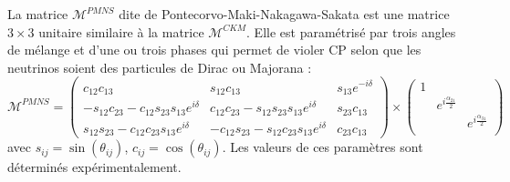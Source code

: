 La matrice $\mathcal{M}^{PMNS}$ dite de Pontecorvo-Maki-Nakagawa-Sakata est une matrice $3\times3$ unitaire similaire à la matrice $\mathcal{M}^{CKM}$. Elle est paramétrisé par trois angles de mélange et d'une ou trois phases qui permet de violer CP selon que les neutrinos soient des particules de Dirac ou Majorana :
\begin{equation}
\mathcal{M}^{PMNS}= 
\begin{pmatrix} 
c_{12}c_{13} & s_{12}c_{13} & s_{13}e^{-i\delta} \\
-s_{12}c_{23}-c_{12}s_{23}s_{13}e^{i\delta} & c_{12}c_{23}-s_{12}s_{23}s_{13}e^{i\delta} & s_{23}c_{13} \\
s_{12}s_{23}-c_{12}c_{23}s_{13}e^{i\delta} & -c_{12}s_{23}-s_{12}c_{23}s_{13}e^{i\delta} & c_{23}c_{13}
\end{pmatrix}\times \begin{pmatrix}
    1 \\
    & e^{i\frac{\alpha_{21}}{2}} \\
    & & e^{i\frac{\alpha_{31}}{2}} \\
\end{pmatrix}
\end{equation}
avec $s_{ij}=\sin(\theta_{ij})$, $c_{ij}=\cos(\theta_{ij})$.
Les valeurs de ces paramètres sont déterminés expérimentalement.
